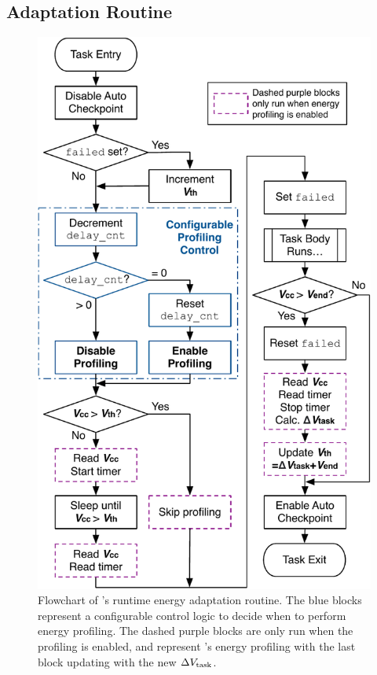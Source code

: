 
\subsection{Adaptation Routine}

\begin{figure}
    \centering
    \includegraphics[width=0.8\columnwidth]{ch5_optic/figures/flowchart.pdf}
    \caption{Flowchart of \nn{}'s runtime energy adaptation routine. The blue blocks represent a configurable control logic to decide when to perform energy profiling. The dashed purple blocks are only run when the profiling is enabled, and represent \nn{}'s energy profiling with the last block updating  with the new $\Delta V_{\text{task}}$. }
    \label{fig:opta_flowchart}
\end{figure}

